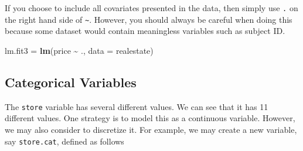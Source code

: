 \documentclass[
]{book}
\newenvironment{Shaded}{\begin{snugshade}}{\end{snugshade}}
\newcommand{\AttributeTok}[1]{\textcolor[rgb]{0.13,0.29,0.53}{#1}}
\newcommand{\CommentTok}[1]{\textcolor[rgb]{0.56,0.35,0.01}{\textit{#1}}}
\newcommand{\DecValTok}[1]{\textcolor[rgb]{0.00,0.00,0.81}{#1}}
\newcommand{\DocumentationTok}[1]{\textcolor[rgb]{0.56,0.35,0.01}{\textbf{\textit{#1}}}}
\newcommand{\FunctionTok}[1]{\textcolor[rgb]{0.13,0.29,0.53}{\textbf{#1}}}
\newcommand{\NormalTok}[1]{#1}
\newcommand{\OtherTok}[1]{\textcolor[rgb]{0.56,0.35,0.01}{#1}}
\newcommand{\SpecialCharTok}[1]{\textcolor[rgb]{0.81,0.36,0.00}{\textbf{#1}}}
\newcommand{\StringTok}[1]{\textcolor[rgb]{0.31,0.60,0.02}{#1}}
\theoremstyle{definition}
\theoremstyle{definition}
\theoremstyle{definition}
\theoremstyle{definition}
\theoremstyle{remark}
\begin{document}
If you choose to include all covariates presented in the data, then simply use \texttt{.} on the right hand side of \texttt{\textasciitilde{}}. However, you should always be careful when doing this because some dataset would contain meaningless variables such as subject ID.

\begin{Shaded}
\begin{Highlighting}[]
\NormalTok{    lm.fit3 }\OtherTok{=} \FunctionTok{lm}\NormalTok{(price }\SpecialCharTok{\textasciitilde{}}\NormalTok{ ., }\AttributeTok{data =}\NormalTok{ realestate)}
\end{Highlighting}
\end{Shaded}

\hypertarget{categorical-variables}{%
\subsection{Categorical Variables}\label{categorical-variables}}

The \texttt{store} variable has several different values. We can see that it has 11 different values. One strategy is to model this as a continuous variable. However, we may also consider to discretize it. For example, we may create a new variable, say \texttt{store.cat}, defined as follows

\begin{Shaded}
\end{Shaded}
\end{document}
